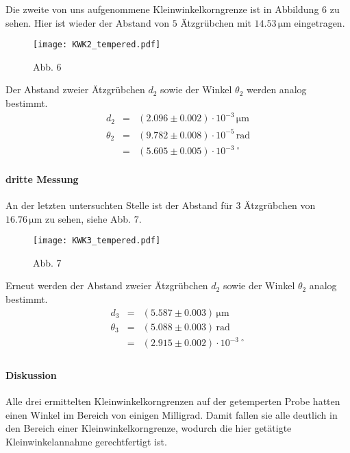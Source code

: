 \documentclass[12pt,a4paper]{scrartcl}
\numberwithin{equation}{section} %
\renewcommand{\[}{} %
\renewcommand{\]}{\noindent} %
\begin{document}
Die zweite von uns aufgenommene Kleinwinkelkorngrenze ist in Abbildung
\(6\) zu sehen. Hier ist wieder der Abstand von \(5\) Ätzgrübchen mit
\(14.53 \mathrm{\, \mu m}\) eingetragen.

\begin{figure}
\centering
\texttt{[image: KWK2\_tempered.pdf]}
\caption{Abb. 6}
\end{figure}

Der Abstand zweier Ätzgrübchen \(d_2\) sowie der Winkel \(\theta_2\)
werden analog bestimmt. \[
\begin{eqnarray}
    d_2 & = & (2.096\pm 0.002) \cdot 10^{-3} \mathrm{\, \mu m} \\
    \theta_2 &=& (9.782 \pm 0.008) \cdot 10^{-5} \mathrm{\, rad} \\
        &=& (5.605 \pm 0.005) \cdot 10^{-3\ \circ}
\end{eqnarray}
\]

\hypertarget{dritte-messung}{%
\paragraph{dritte Messung}\label{dritte-messung}}

An der letzten untersuchten Stelle ist der Abstand für \(3\) Ätzgrübchen
von \(16.76 \mathrm{\, \mu m}\) zu sehen, siehe Abb. \(7\).

\begin{figure}
\centering
\texttt{[image: KWK3\_tempered.pdf]}
\caption{Abb. 7}
\end{figure}

Erneut werden der Abstand zweier Ätzgrübchen \(d_2\) sowie der Winkel
\(\theta_2\) analog bestimmt. \[
\begin{eqnarray}
    d_3 &=& (5.587 \pm 0.003) \mathrm{\, \mu m} \\
    \theta_3 &=& (5.088 \pm 0.003) \mathrm{\, rad} \\
        &=& (2.915 \pm 0.002) \cdot 10^{-3\ \circ} \\
\end{eqnarray}
\]

\hypertarget{diskussion-1}{%
\paragraph{Diskussion}\label{diskussion-1}}

Alle drei ermittelten Kleinwinkelkorngrenzen auf der getemperten Probe
hatten einen Winkel im Bereich von einigen Milligrad. Damit fallen sie
alle deutlich in den Bereich einer Kleinwinkelkorngrenze, wodurch die
hier getätigte Kleinwinkelannahme gerechtfertigt ist.
\end{document}
